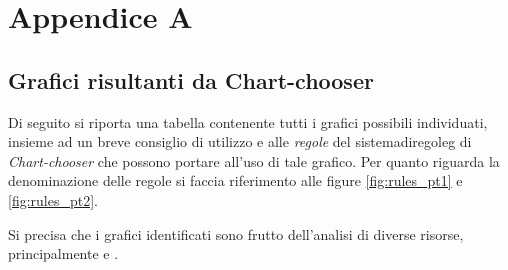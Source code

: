 \chapter{Appendice A}\label{cap:appendix}

\section{Grafici risultanti da Chart-chooser}
Di seguito si riporta una tabella contenente tutti i grafici possibili individuati, insieme ad un breve consiglio 
di utilizzo e alle \emph{regole} del \gls{sistemadiregoleg} di \emph{Chart-chooser} che possono portare all'uso 
di tale grafico. Per quanto riguarda la denominazione delle regole si faccia riferimento alle figure \ref{fig:rules_pt1} 
e \ref{fig:rules_pt2}.

Si precisa che i grafici identificati sono frutto dell'analisi di diverse risorse, principalmente \cite{site:data-to-viz} e \cite{site:vis_vocabulary}.

